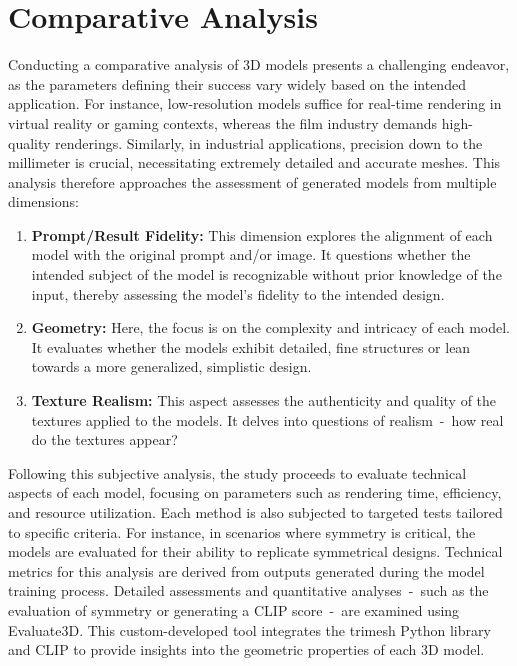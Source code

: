 \section{Comparative Analysis}\label{comparativeAnalysis}

Conducting a comparative analysis of 3D models presents a challenging endeavor, as the parameters defining their success vary widely based on the intended application. For instance, low-resolution models suffice for real-time rendering in virtual reality or gaming contexts, whereas the film industry demands high-quality renderings. Similarly, in industrial applications, precision down to the millimeter is crucial, necessitating extremely detailed and accurate meshes. This analysis therefore approaches the assessment of generated models from multiple dimensions:

\begin{enumerate}
    \item \textbf{Prompt/Result Fidelity:} This dimension explores the alignment of each model with the original prompt and/or image. It questions whether the intended subject of the model is recognizable without prior knowledge of the input, thereby assessing the model's fidelity to the intended design.
    \item \textbf{Geometry:} Here, the focus is on the complexity and intricacy of each model. It evaluates whether the models exhibit detailed, fine structures or lean towards a more generalized, simplistic design. 
    \item \textbf{Texture Realism:} This aspect assesses the authenticity and quality of the textures applied to the models. It delves into questions of realism~-~how real do the textures appear?
\end{enumerate}

Following this subjective analysis, the study proceeds to evaluate technical aspects of each model, focusing on parameters such as rendering time, efficiency, and resource utilization. Each method is also subjected to targeted tests tailored to specific criteria. For instance, in scenarios where symmetry is critical, the models are evaluated for their ability to replicate symmetrical designs. Technical metrics for this analysis are derived from outputs generated during the model training process. Detailed assessments and quantitative analyses~-~such as the evaluation of symmetry or generating a CLIP score~-~are examined using Evaluate3D. This custom-developed tool integrates the trimesh Python library \citep{trimesh} and CLIP \citep{radfordCLIP} to provide insights into the geometric properties of each 3D model.



 
    
    
    